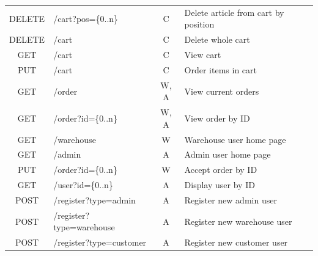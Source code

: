 \documentclass{article}
\begin{document}
\begin{table}[H]
\begin{tabular}{|clcl|}
\multicolumn{1}{|l|}{DELETE} & \multicolumn{1}{l|}{/cart?pos=\{0..n\}}       & \multicolumn{1}{c|}{C}       & Delete article from cart by position \\
\multicolumn{1}{|l|}{DELETE} & \multicolumn{1}{l|}{/cart}                    & \multicolumn{1}{c|}{C}       & Delete whole cart                    \\
\multicolumn{1}{|c|}{GET}    & \multicolumn{1}{l|}{/cart}                    & \multicolumn{1}{c|}{C}       & View cart                            \\
\multicolumn{1}{|c|}{PUT}    & \multicolumn{1}{l|}{/cart}                    & \multicolumn{1}{c|}{C}       & Order items in cart                  \\
\multicolumn{1}{|c|}{GET}    & \multicolumn{1}{l|}{/order}                   & \multicolumn{1}{c|}{W, A}    & View current orders                  \\
\multicolumn{1}{|c|}{GET}    & \multicolumn{1}{l|}{/order?id=\{0..n\}}       & \multicolumn{1}{c|}{W, A}    & View order by ID                     \\
\multicolumn{1}{|c|}{GET}    & \multicolumn{1}{l|}{/warehouse}               & \multicolumn{1}{c|}{W}       & Warehouse user home page             \\
\multicolumn{1}{|c|}{GET}    & \multicolumn{1}{l|}{/admin}                   & \multicolumn{1}{c|}{A}       & Admin user home page                 \\
\multicolumn{1}{|c|}{PUT}    & \multicolumn{1}{l|}{/order?id=\{0..n\}}       & \multicolumn{1}{c|}{W}       & Accept order by ID                   \\
\multicolumn{1}{|c|}{GET}    & \multicolumn{1}{l|}{/user?id=\{0..n\}}        & \multicolumn{1}{c|}{A}       & Display user by ID                   \\
\multicolumn{1}{|c|}{POST}   & \multicolumn{1}{l|}{/register?type=admin}     & \multicolumn{1}{c|}{A}       & Register new admin user              \\
\multicolumn{1}{|c|}{POST}   & \multicolumn{1}{l|}{/register?type=warehouse} & \multicolumn{1}{c|}{A}       & Register new warehouse user          \\
\multicolumn{1}{|c|}{POST}   & \multicolumn{1}{l|}{/register?type=customer}  & \multicolumn{1}{c|}{A}       & Register new customer user           \\ \hline
\end{tabular}
\end{table}
\end{document}

